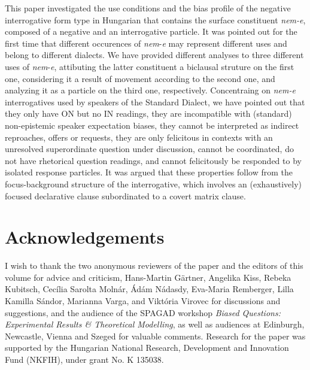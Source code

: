 \documentclass[output=paper,colorlinks,citecolor=brown]{langscibook}
\begin{document}
	This paper investigated the use conditions and the bias profile of the  negative interrogative form type in Hungarian that contains the surface constituent \textit{nem-e}, composed of a negative and an interrogative particle. It was pointed out for the first time that different occurences  of \textit{nem}\nobreakdash-\textit{e} may represent different uses and belong to different dialects. We have provided different analyses to three different uses of \textit{nem}\nobreakdash-\textit{e},  attibuting the latter constituent  a biclausal struture on the first one, considering it  a result of movement according to the second one, and analyzing it as  a particle on the third one, respectively.  Concentraing on \textit{nem-e} interrogatives used by speakers of the Standard Dialect, we have pointed out that they only have ON but no IN readings, they are incompatible with (standard) non-epistemic speaker expectation biases, they cannot be interpreted as indirect reproaches, offers or requests, they are only felicitous in contexts with an unresolved superordinate question under discussion, cannot be coordinated, do not have rhetorical question readings, and  cannot felicitously be responded to by isolated response particles.  It was argued that these properties follow from the focus-background structure of the interrogative, which involves an (exhaustively) focused declarative clause subordinated to a covert matrix clause.
	
	
\section*{Acknowledgements}
	I wish to thank the two anonymous reviewers of the paper and the editors of this volume for advice and criticism, Hans-Martin Gärtner, Angelika Kiss, Rebeka Kubitsch, Cecília Sarolta Molnár, Ádám Nádasdy, Eva-Maria Remberger, Lilla Kamilla Sándor, Marianna Varga, and Viktória Virovec for  discussions and suggestions, and the audience of  the SPAGAD workshop \textit{Biased Questions: Experimental Results \& Theoretical Modelling}, as well as audiences at Edinburgh, Newcastle, Vienna and Szeged for valuable comments. Research for the paper was supported by the Hungarian National Research, Development and Innovation Fund (NKFIH), under grant No. K 135038.
	
	
\printbibliography[heading=subbibliography,notkeyword=this]
	
\end{document}
